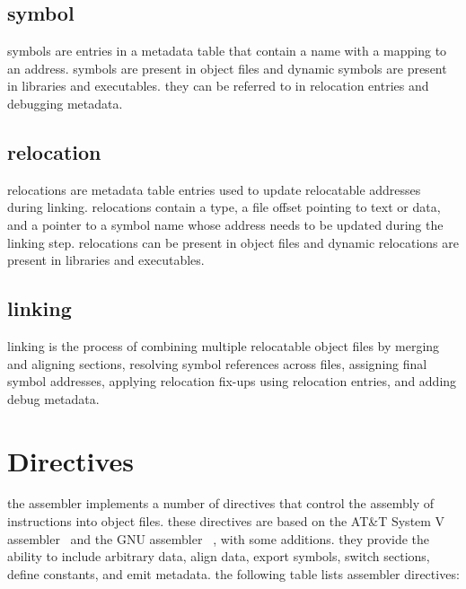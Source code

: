 \subsection{symbol}
symbols are entries in a metadata table that contain a name with a
mapping to an address. symbols are present in object files and dynamic
symbols are present in libraries and executables. they can be
referred to in relocation entries and debugging metadata.

\subsection{relocation}
relocations are metadata table entries used to update relocatable addresses
during linking. relocations contain a type, a file offset pointing to text
or data, and a pointer to a symbol name whose address needs to be updated
during the linking step. relocations can be present in object files and
dynamic relocations are present in libraries and executables.

\subsection{linking}
linking is the process of combining multiple relocatable object
files by merging and aligning sections, resolving symbol references across
files, assigning final symbol addresses, applying relocation fix-ups using
relocation entries, and adding debug metadata.

\newpage
\section{Directives}
the assembler implements a number of directives that control the assembly
of instructions into object files. these directives are based on the
AT\&T System V assembler~\cite{att-svr4-asm} and the GNU assembler%
~\cite{gnu-as-manual}, with some additions. they provide the ability to
include arbitrary data, align data, export symbols, switch sections,
define constants, and emit metadata.
\para
the following table lists \arch{} assembler directives:

